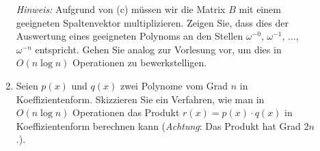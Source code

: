 \documentclass[a4paper,twoside,12pt]{article}
\begin{document}
\begin{description}
\begin{enumerate}
  \emph{Hinweis:} Aufgrund von (c) m\"ussen wir die Matrix $B$
     mit einem geeigneten Spaltenvektor multiplizieren. Zeigen Sie,
     dass dies der Auswertung eines geeigneten Polynoms an den Stellen
     $\omega^{-0}$, $\omega^{-1}$, $\ldots$, $\omega^{-n}$ entspricht.
     Gehen Sie analog zur Vorlesung vor, um dies in
     $O(n \log n)$ Operationen zu bewerkstelligen.

 \item 
    Seien $p(x)$ und $q(x)$ zwei Polynome vom Grad $n$
    in Koeffizientenform. 
    Skizzieren Sie ein Verfahren, wie man in $O(n\log n)$ Operationen
    das Produkt $r(x) = p(x) \cdot q(x)$
    in Koeffizientenform berechnen kann 
    (\emph{Achtung}: Das Produkt hat Grad $2n$.).
\end{enumerate}
\fi
\end{description}
\end{document}

